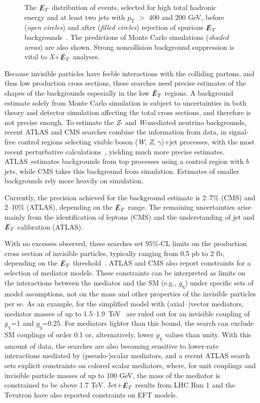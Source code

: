 \documentclass{ar-1col}
\newcommand{\chiDM}{\ensuremath{\chi}\xspace}
\newcommand{\IP}{invisible particle}
\newcommand{\gDM}{\ensuremath{g_{\chiDM}}\xspace}
\newcommand{\gdm}{\gDM}
\newcommand{\gq}{$g_{\mathrm{q}}$\xspace}
\newcommand{\pt}{\ensuremath{p_\mathrm{T}}\xspace}
\newcommand{\MET}{\ensuremath{\slashed{E}_T}\xspace}
\newcommand{\fb}{\ensuremath{\mathrm{fb}}\xspace}
\newcommand{\pb}{\ensuremath{\mathrm{pb}}\xspace}
\begin{document}
\begin{figure}[!htpb]
\caption{The \MET distribution of events, selected for high total
hadronic energy and at least two jets with \pt{} $>$ 400 and 200
GeV, before (\textit{open circles}) and after (\textit{filled circles}) rejection of
spurious \MET backgrounds~\cite{CMS-PAS-JME-16-004}. The
predictions of Monte Carlo  simulations (\textit{shaded areas}) are also shown. Strong
noncollision background suppression is vital to \textit{X}+\MET analyses.}
\label{fig:fakeMET}
\end{figure}

Because {\IP}s have feeble interactions with the colliding
partons, and thus low production cross sections, these searches
need precise estimates of the shapes of the backgrounds especially in the low \MET regions.
A background estimate solely from Monte Carlo simulation is subject to
uncertainties in both theory and detector simulation affecting the
total cross sections, and therefore is not precise enough. To
estimate the \textit{Z}- and \textit{W}-mediated neutrino backgrounds, recent ATLAS
and CMS searches combine the information from data, in signal-free
{control regions} selecting visible boson (\textit{W},
\textit{Z}, $\gamma$)+jet processes, with the most recent perturbative
calculations~\cite{Lindert:2017olm}, yielding much more precise estimates.
ATLAS\ estimates backgrounds from top processes using a
control region with $b$ jets, while CMS takes this background from
simulation. Estimates of smaller backgrounds rely more heavily on
simulation.

Currently, the precision achieved for the background estimate is 2--7\%
(CMS) and 2--10\% (ATLAS), depending on the \MET range. The
remaining uncertainties arise mainly from the identification of
leptons (CMS) and the understanding of jet and \MET
calibration (ATLAS).

With no excesses observed, these searches set 95\%-CL limits
on the production cross section of {\IP}s, typically ranging from
0.5 \pb to 2 \fb, depending on the \MET
threshold~\cite{Aaboud:2017phn}. ATLAS and CMS also report
constraints for a selection of mediator models. These constraints
can be interpreted as limits on the interactions between the
mediator and the SM (e.g., \gq) under specific sets of model
assumptions, not on the mass and other properties of the {\IP}s
per se. As an example, for the simplified model with
(axial--)vector mediators, mediator masses of up to
1.5--1.9~TeV~\cite{Aaboud:2017phn,Sirunyan:2017jix} are ruled out
for an invisible coupling of \gdm=1 and \gq=0.25. For mediators lighter than
this bound, the search can exclude SM couplings of order 0.1 or,
alternatively, lower \gdm values than unity. With this amount of
data, the searches are also becoming sensitive to lower-rate
interactions mediated by (pseudo-)scalar mediators, and a recent
ATLAS search~\cite{Aaboud:2017phn} sets explicit constraints on
colored scalar mediators, where, for unit couplings and invisible
particle masses of up to 100 GeV, the mass of the mediator is
constrained to be above 1.7 TeV. Jet+\MET results from LHC Run 1
and the Tevatron have also reported constraints on EFT models.
\end{document}
